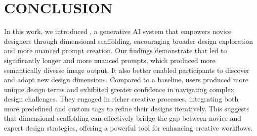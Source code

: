 \section{CONCLUSION}
In this work, we introduced \toolname{}, a generative AI system that empowers novice designers through dimensional scaffolding, encouraging broader design exploration and more nuanced prompt creation. Our findings demonstrate that \toolname{} led to significantly longer and more nuanced prompts, which produced more semantically diverse image output. It also better enabled participants to discover and adopt new design dimensions. Compared to a baseline, \toolname{} users produced more unique design terms and exhibited greater confidence in navigating complex design challenges. They engaged in richer creative processes, integrating both more predefined and custom tags to refine their designs iteratively. This suggests that dimensional scaffolding can effectively bridge the gap between novice and expert design strategies, offering a powerful tool for enhancing creative workflows.